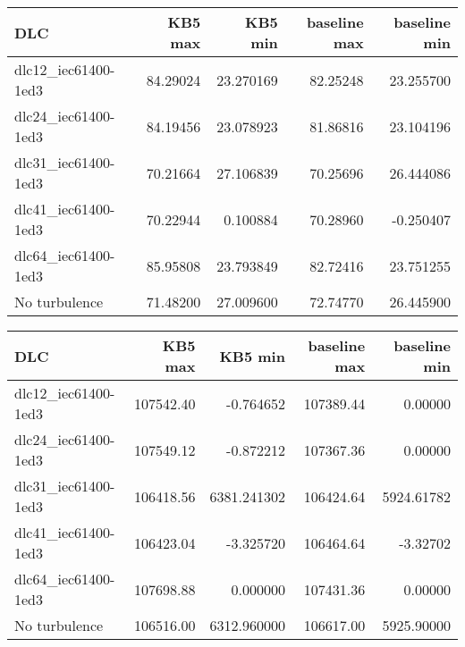 \begin{tabular}{lrrrr}
\toprule
                 DLC &    KB5 max &    KB5 min &  baseline max &  baseline min \\
\midrule
 dlc12\_iec61400-1ed3 &  84.29024 &  23.270169 &      82.25248 &     23.255700 \\
 dlc24\_iec61400-1ed3 &  84.19456 &  23.078923 &      81.86816 &     23.104196 \\
 dlc31\_iec61400-1ed3 &  70.21664 &  27.106839 &      70.25696 &     26.444086 \\
 dlc41\_iec61400-1ed3 &  70.22944 &   0.100884 &      70.28960 &     -0.250407 \\
 dlc64\_iec61400-1ed3 &  85.95808 &  23.793849 &      82.72416 &     23.751255 \\
        No turbulence &  71.48200 &  27.009600 &      72.74770 &     26.445900 \\
\bottomrule
\end{tabular}


\begin{tabular}{lrrrr}
\toprule
                 DLC &    KB5 max &      KB5 min &  baseline max &  baseline min \\
\midrule
 dlc12\_iec61400-1ed3 &  107542.40 &    -0.764652 &     107389.44 &       0.00000 \\
 dlc24\_iec61400-1ed3 &  107549.12 &    -0.872212 &     107367.36 &       0.00000 \\
 dlc31\_iec61400-1ed3 &  106418.56 &  6381.241302 &     106424.64 &    5924.61782 \\
 dlc41\_iec61400-1ed3 &  106423.04 &    -3.325720 &     106464.64 &      -3.32702 \\
 dlc64\_iec61400-1ed3 &  107698.88 &     0.000000 &     107431.36 &       0.00000 \\
        No turbulence &  106516.00 &  6312.960000 &     106617.00 &    5925.90000 \\
\bottomrule
\end{tabular}

\clearpage


